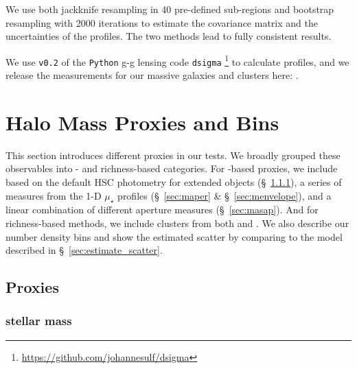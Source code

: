 \documentclass[fleqn,usenatbib,useAMS]{mnras}
\begin{document}
    We use both jackknife resampling in 40 pre-defined sub-regions and bootstrap resampling with
    2000 iterations to estimate the covariance matrix and the uncertainties of the \dsigma{}
    profiles.
    The two methods lead to fully consistent results.

    We use \texttt{v0.2} of the \texttt{Python} g-g lensing code \texttt{dsigma}
    \footnote{\url{https://github.com/johannesulf/dsigma}} to calculate \dsigma{} profiles, and we
    release the \dsigma{} measurements for our massive galaxies and clusters here:
    \href{https://zenodo.org/record/5259075}{\faDatabase}.

\section{Halo Mass Proxies and Bins}
    \label{sec:proxies}

    This section introduces different \mvir{} proxies in our \topn{} tests.
    We broadly grouped these observables into \mstar{}- and richness-based categories. 
    For \mstar{}-based proxies, we include \mstar{} based on the default HSC photometry for extended
    objects (\S\ \ref{sec:mcmodel}), a series of \mstar{} measures from the 1-D $\mu_{\star}$
    profiles (\S\ \ref{sec:maper} \& \S\ \ref{sec:menvelope}), and a linear combination of different
    aperture \mstar{} measures (\S\ \ref{sec:masap}).
    And for richness-based methods, we include clusters from both \redm{} and \camira{}. 
    We also describe our number density bins and show the estimated scatter by comparing to the model 
    described in \S\ \ref{sec:estimate_scatter}.
    
\subsection{Proxies}

\subsubsection{\cmodel{} stellar mass}
    \label{sec:mcmodel}
\end{document}

